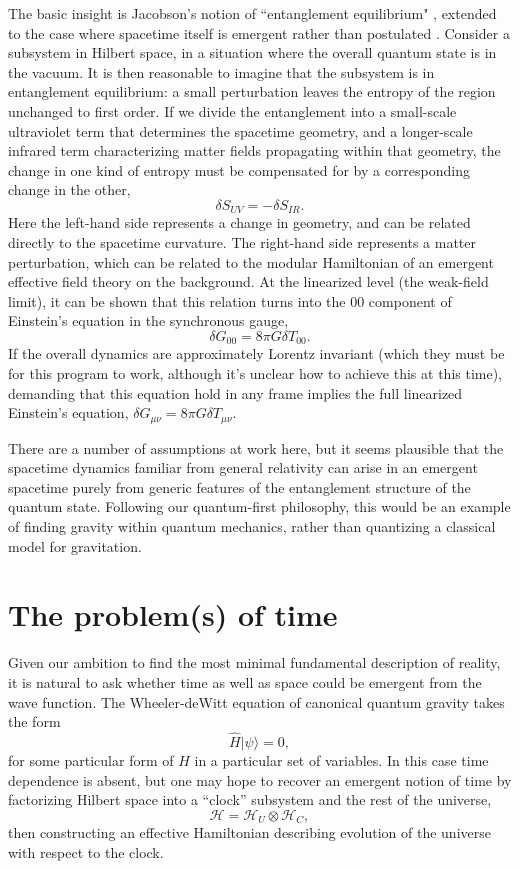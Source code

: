 \documentclass[12pt,english]{article}
\newcommand{\be}{\begin{equation}}
\newcommand{\ee}{\end{equation}}
\newcommand{\HH}{\mathcal{H}}
\begin{document}
The basic insight is Jacobson's notion of ``entanglement equilibrium" \cite{Jacobson:2015hqa}, extended to the case where spacetime itself is emergent rather than postulated \cite{Cao:2017hrv}.
Consider a subsystem in Hilbert space, in a situation where the overall quantum state is in the vacuum.
It is then reasonable to imagine that the subsystem is in entanglement equilibrium: a small perturbation leaves the entropy of the region unchanged to first order.
If we divide the entanglement into a small-scale ultraviolet term that determines the spacetime geometry, and a longer-scale infrared term characterizing matter fields propagating within that geometry, the change in one kind of entropy must be compensated for by a corresponding change in the other,
\be
  \delta S_{UV} = - \delta S_{IR}.
\ee
Here the left-hand side represents a change in geometry, and can be related directly to the spacetime curvature.
The right-hand side represents a matter perturbation, which can be related to the modular Hamiltonian of an emergent effective field theory on the background.
At the linearized level (the weak-field limit), it can be shown that this relation turns into the $00$ component of Einstein's equation in the synchronous gauge,
\be
  \delta G_{00} = 8\pi G \delta T_{00}.
\ee
If the overall dynamics are approximately Lorentz invariant (which they must be for this program to work, although it's unclear how to achieve this at this time), demanding that this equation hold in any frame implies the full linearized Einstein's equation, $\delta G_{\mu\nu} = 8\pi G \delta T_{\mu\nu}$.

There are a number of assumptions at work here, but it seems plausible that the spacetime dynamics familiar from general relativity can arise in an emergent spacetime purely from generic features of the entanglement structure of the quantum state.
Following our quantum-first philosophy, this would be an example of finding gravity within quantum mechanics, rather than quantizing a classical model for gravitation.

\section {The problem(s) of time}

Given our ambition to find the most minimal fundamental description of reality, it is natural to ask whether time as well as space could be emergent from the wave function.
The Wheeler-deWitt equation of canonical quantum gravity takes the form
\be
  \hat{H}|\psi\rangle = 0,
\ee
for some particular form of $\hat H$ in a particular set of variables.
In this case time dependence is absent, but one may hope to recover an emergent notion of time by factorizing Hilbert space into a ``clock'' subsystem and the rest of the universe, 
\be
  \HH = \HH_U \otimes \HH_C,
  \label{clock}
\ee
then constructing an effective Hamiltonian describing evolution of the universe with respect to the clock.
\end{document}
